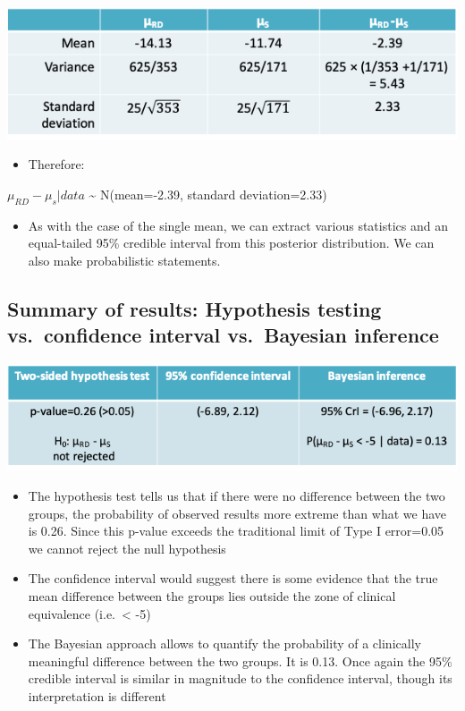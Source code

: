 \documentclass[
]{book}
\providecommand{\tightlist}{%
  \setlength{\itemsep}{0pt}\setlength{\parskip}{0pt}}
\begin{document}
\includegraphics[width=1\linewidth]{./6_42}

\begin{itemize}
\tightlist
\item
  Therefore:
\end{itemize}

\(\mu_{RD}-\mu_s|data\) \textasciitilde{} N(mean=-2.39, standard deviation=2.33)

\begin{itemize}
\tightlist
\item
  As with the case of the single mean, we can extract various statistics and an equal-tailed 95\% credible interval from this posterior distribution. We can also make probabilistic statements.
\end{itemize}

\hypertarget{summary-of-results-hypothesis-testing-vs.-confidence-interval-vs.-bayesian-inference}{%
\subsection{Summary of results: Hypothesis testing vs.~confidence interval vs.~Bayesian inference}\label{summary-of-results-hypothesis-testing-vs.-confidence-interval-vs.-bayesian-inference}}

\includegraphics[width=1\linewidth]{./6_43}

\begin{itemize}
\tightlist
\item
  The hypothesis test tells us that if there were no difference between the two groups, the probability of observed results more extreme than what we have is 0.26. Since this p-value exceeds the traditional limit of Type I error=0.05 we cannot reject the null hypothesis
\item
  The confidence interval would suggest there is some evidence that the true mean difference between the groups lies outside the zone of clinical equivalence (i.e.~\textless{} -5)
\item
  The Bayesian approach allows to quantify the probability of a clinically meaningful difference between the two groups. It is 0.13. Once again the 95\% credible interval is similar in magnitude to the confidence interval, though its interpretation is different
\end{itemize}
\end{document}
